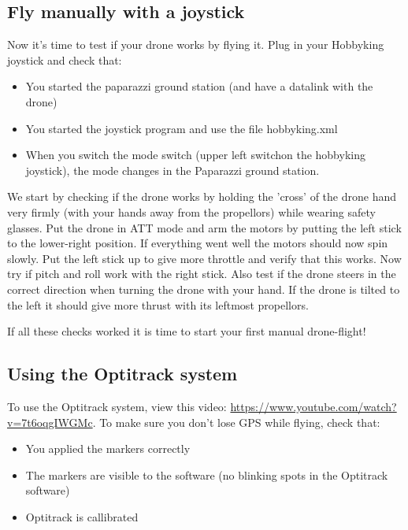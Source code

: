 \documentclass{article}
\begin{document}
\subsection*{Fly manually with a joystick }
Now it's time to test if your drone works by flying it. Plug in your Hobbyking joystick and check that:
\begin{itemize}
\item You started the paparazzi ground station (and have a datalink with the drone)
\item You started the joystick program and use the file hobbyking.xml
\item When you switch the mode switch (upper left switchon the hobbyking joystick), the mode changes in the Paparazzi ground station.
\end{itemize}

We start by checking if the drone works by holding the 'cross' of the drone hand very firmly (with your hands away from the propellors) while wearing safety glasses. Put the drone in ATT mode and arm the motors by putting the left stick to the lower-right position. If everything went well the motors should now spin slowly. Put the left stick up to give more throttle and verify that this works. Now try if pitch and roll work with the right stick. 
Also test if the drone steers in the correct direction when turning the drone with your hand. If the drone is tilted to the left it should give more thrust with its leftmost propellors. 

If all these checks worked it is time to start your first manual drone-flight! 

\subsection*{Using the Optitrack system}
To use the Optitrack system, view this video: \url{https://www.youtube.com/watch?v=7t6oqgIWGMc}.
To make sure you don't lose GPS while flying, check that:
\begin{itemize}
\item You applied the markers correctly 
\item The markers are visible to the software (no blinking spots in the Optitrack software)
\item Optitrack is callibrated
\end{itemize}
\end{document}
